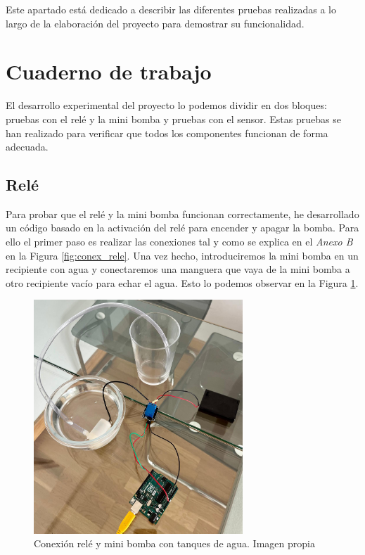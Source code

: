 
Este apartado está dedicado a describir las diferentes pruebas realizadas a lo largo de la elaboración del proyecto para demostrar su funcionalidad. 

\section{Cuaderno de trabajo}

El desarrollo experimental del proyecto lo podemos dividir en dos bloques: pruebas con el relé y la mini bomba y pruebas con el sensor. Estas pruebas se han realizado para verificar que todos los componentes funcionan de forma adecuada.

\subsection{Relé}
Para probar que el relé y la mini bomba funcionan correctamente, he desarrollado un código basado en la activación del relé para encender y apagar la bomba. Para ello el primer paso es realizar las conexiones tal y como se explica en el \textit{Anexo B} en la Figura \ref{fig:conex_rele}. Una vez hecho, introduciremos la mini bomba en un recipiente con agua y conectaremos una manguera que vaya de la mini bomba a otro recipiente vacío para echar el agua. Esto lo podemos observar en la Figura \ref{fig:conex_rele_bomba}.
\begin{figure}[H]
    \centering
    \includegraphics[width=0.7\textwidth]{img/releBomba.jpg}
    \caption{Conexión relé y mini bomba con tanques de agua. Imagen propia}
    \label{fig:conex_rele_bomba}
\end{figure}


